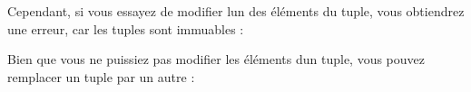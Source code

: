 \begin{Shaded}
\begin{Highlighting}[]
\OperatorTok{\textgreater{}\textgreater{}\textgreater{}}\OperatorTok{=}\NormalTok{ (}\NormalTok{, }\NormalTok{, }\NormalTok{, }\NormalTok{, }\NormalTok{)}
\OperatorTok{\textgreater{}\textgreater{}\textgreater{}}\NormalTok{ t[}\NormalTok{]}
\OperatorTok{\textgreater{}\textgreater{}\textgreater{}}\NormalTok{ t[}\NormalTok{:}\NormalTok{]}
\NormalTok{(}\NormalTok{, }\NormalTok{)}
\end{Highlighting}
\end{Shaded}

Cependant, si vous essayez de modifier l\textquotesingle un des éléments
du tuple, vous obtiendrez une erreur, car les tuples sont immuables :

\begin{Shaded}
\begin{Highlighting}[]
\OperatorTok{\textgreater{}\textgreater{}\textgreater{}}\NormalTok{ t[}\NormalTok{] }\OperatorTok{=} 
\NormalTok{: } 
\end{Highlighting}
\end{Shaded}

Bien que vous ne puissiez pas modifier les éléments d\textquotesingle un
tuple, vous pouvez remplacer un tuple par un autre :

\begin{Shaded}
\begin{Highlighting}[]
\OperatorTok{\textgreater{}\textgreater{}\textgreater{}}\OperatorTok{=}\NormalTok{ (}\NormalTok{,) }\OperatorTok{+}\NormalTok{ t[}\NormalTok{:]}
\OperatorTok{\textgreater{}\textgreater{}\textgreater{}}
\NormalTok{(}\NormalTok{, }\NormalTok{, }\NormalTok{, }\NormalTok{, }\NormalTok{)}
\end{Highlighting}
\end{Shaded}

